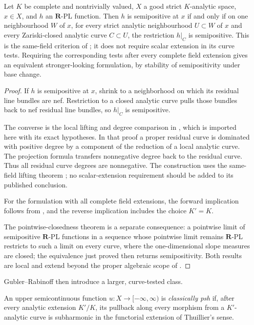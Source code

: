 \begin{theorem}\label{thm:gr-pl-curve-test}
Let $K$ be complete and nontrivially valued, $X$ a good strict
$K$-analytic space, $x\in X$, and $h$ an $\mathbf R$-PL function.
Then $h$ is semipositive at $x$ if and only if on one neighbourhood
$W$ of $x$, for every strict analytic neighbourhood $U\subset W$ of $x$
and every Zariski-closed analytic curve $C\subset U$, the restriction
$h|_C$ is semipositive.  This is the same-field criterion of
\cite[Theorem~5.3]{GR25PL}; it does not require scalar extension in its
curve tests.  Requiring the corresponding tests after every complete field
extension gives an equivalent stronger-looking formulation, by stability
of semipositivity under base change.
\end{theorem}
\begin{proof}
If $h$ is semipositive at $x$, shrink to a neighborhood on which its residual
line bundles are nef.  Restriction to a closed analytic curve pulls those
bundles back to nef residual line bundles, so $h|_C$ is semipositive.

The converse is the local lifting and degree comparison in
\cite[Theorem~5.3]{GR25PL}, which is imported here with its exact
hypotheses.  In that proof a proper residual curve is dominated with
positive degree by a component of the reduction of a local analytic curve.
The projection formula transfers nonnegative degree back to the residual
curve.  Thus all residual curve degrees are nonnegative.  The construction
uses the same-field lifting theorem \cite[Theorem~4.1]{GR25PL}; no
scalar-extension requirement should be added to its published conclusion.

For the formulation with all complete field extensions, the forward
implication follows from \cite[Proposition~7.6]{GJR26}, and the reverse
implication includes the choice $K'=K$.

The pointwise-closedness theorem
\cite[Theorem~5.6]{GR25PL} is a separate consequence: a pointwise limit of
semipositive $\mathbf R$-PL functions in a sequence whose pointwise limit
remains $\mathbf R$-PL restricts
to such a limit on every curve, where the one-dimensional slope measures are
closed; the equivalence just proved then returns semipositivity.  Both
results are local and extend beyond the proper algebraic scope of
\cite{GM19}.
\end{proof}

Gubler--Rabinoff then introduce a larger, curve-tested class.

\begin{definition}
\label{def:ch18-classically-psh}
An upper semicontinuous function $u:X\to[-\infty,\infty)$ is
\emph{classically psh} if, after every analytic extension $K'/K$, its
pullback along every morphism from a $K'$-analytic curve is subharmonic in
the functorial extension of Thuillier's sense.
\end{definition}

